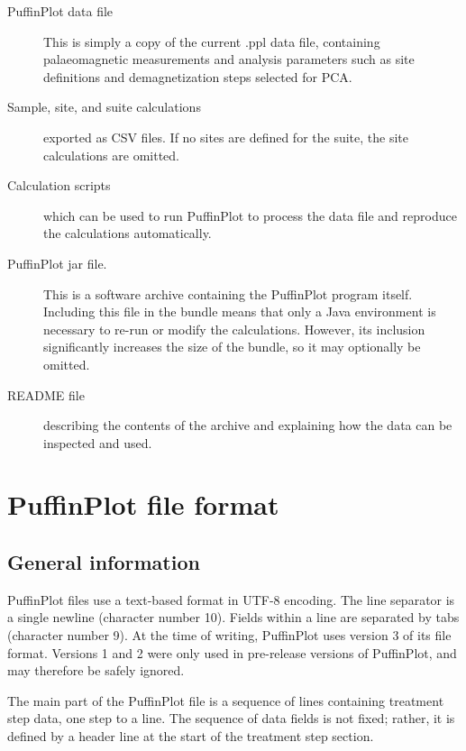 \documentclass[a4paper,british]{article}
\begin{document}
\begin{description}

\item[PuffinPlot data file] This is simply a copy of the current .ppl
  data file, containing palaeomagnetic measurements and analysis
  parameters such as site definitions and demagnetization steps selected
  for PCA.

\item[Sample, site, and suite calculations] exported as CSV files. If
  no sites are defined for the suite, the site calculations are omitted.

\item[Calculation scripts] which can be used to run PuffinPlot to
  process the data file and reproduce the calculations automatically.

\item[PuffinPlot jar file.] This is a software archive containing the
  PuffinPlot program itself. Including this file in the bundle means
  that only a Java environment is necessary to re-run or modify the
  calculations. However, its inclusion significantly increases the size
  of the bundle, so it may optionally be omitted.
  
\item[README file] describing the contents of the archive and explaining
  how the data can be inspected and used.
  
\end{description}

\section{PuffinPlot file format}

\subsection{General information}

PuffinPlot files use a text-based format in UTF-8 encoding. The line separator
is a single newline (character number 10). Fields within a line are separated
by tabs (character number 9). At the time of writing, PuffinPlot uses version 3
of its file format. Versions 1 and 2 were only used in pre-release versions of
PuffinPlot, and may therefore be safely ignored.

The main part of the PuffinPlot file is a sequence of lines containing treatment
step data, one step to a line. The sequence of data fields is not fixed; rather,
it is defined by a header line at the start of the treatment step section.
\end{document}
